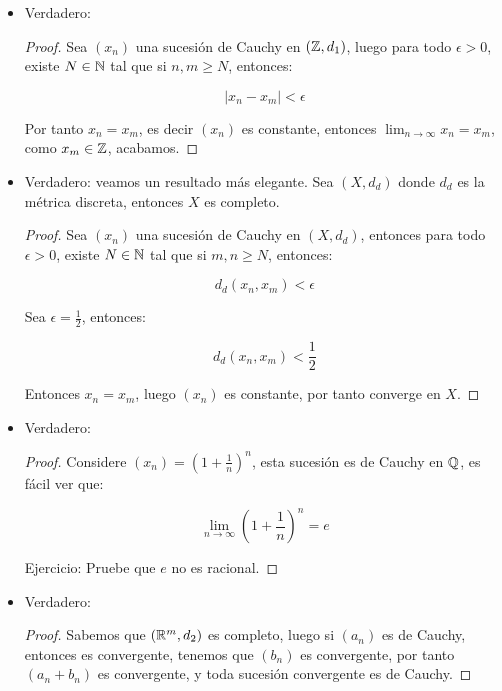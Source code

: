 \begin{itemize}[label={✎},leftmargin=*]
    \item Verdadero:\\

    \begin{proof}
        Sea $(x_n)$ una sucesión de Cauchy en $(\mathbb{Z},d_1)$, luego para todo $\epsilon>0$, existe $N\in \mathbb{N}$ tal que si $n,m\geq N$, entonces:

        $$|x_n-x_m|<\epsilon$$

        Por tanto $x_n=x_m$, es decir $(x_n)$ es constante, entonces $\lim_{n \to \infty} x_n=x_m$, como $x_m \in \mathbb{Z}$, acabamos.
    \end{proof}

    \item Verdadero: veamos un resultado más elegante. Sea $(X,d_d)$ donde $d_d$ es la métrica discreta, entonces $X$ es completo.\\

    \begin{proof}
        Sea $(x_n)$ una sucesión de Cauchy en $(X,d_d)$, entonces para todo $\epsilon>0$, existe $N\in\mathbb{N}$ tal que si $m,n\geq N$, entonces:

        $$d_d(x_n,x_m)<\epsilon$$

        Sea $\epsilon=\frac{1}{2}$, entonces:

        $$d_d(x_n,x_m)<\frac{1}{2}$$

        Entonces $x_n=x_m$, luego $(x_n)$ es constante, por tanto converge en $X$.
    \end{proof}

    \item Verdadero:\\

    \begin{proof}
        Considere $(x_n)=\left( 1+\frac{1}{n} \right)^n$, esta sucesión es de Cauchy en $\mathbb{Q}$, es fácil ver que:

        $$\lim_{n \to \infty} \left( 1+\frac{1}{n} \right)^n=e$$

        Ejercicio: Pruebe que $e$ no es racional.
    \end{proof} 

    \item Verdadero:\\ 

    \begin{proof}
        Sabemos que $(\mathbb{R}^m,d_2)$ es completo, luego si $(a_n)$ es de Cauchy, entonces es convergente, tenemos que $(b_n)$ es convergente, por tanto $(a_n+b_n)$ es convergente, y toda sucesión convergente es de Cauchy.
    \end{proof}


\end{itemize}
